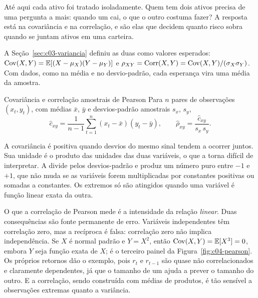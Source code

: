 Até aqui cada ativo foi tratado isoladamente. Quem tem dois ativos precisa de uma pergunta a mais: quando um cai, o que o outro costuma fazer? A resposta está na covariância e na correlação, e são elas que decidem quanto risco sobra quando se juntam ativos em uma carteira.

A Seção~\ref{sec:c03-variancia} definiu as duas como valores esperados: $\operatorname{Cov}(X, Y) = \operatorname{\mathbb{E}}[(X-\mu_X)(Y-\mu_Y)]$ e $\rho_{XY} = \operatorname{Corr}(X, Y) = \operatorname{Cov}(X, Y)/(\sigma_X\sigma_Y)$. Com dados, como na média e no desvio-padrão, cada esperança vira uma média da amostra.

\begin{definicao}{Covariância e correlação amostrais de Pearson}
Para $n$ pares de observações $(x_t, y_t)$, com médias $\bar x$, $\bar y$ e desvios-padrão amostrais $s_x$, $s_y$,
\begin{equation}
  \hat c_{xy} = \frac{1}{n-1}\sum_{t=1}^{n} (x_t - \bar x)(y_t - \bar y) , \qquad
  \hat\rho_{xy} = \frac{\hat c_{xy}}{s_x\, s_y} .
  \label{eq:c04-corr}
\end{equation}
\end{definicao}

A covariância é positiva quando desvios do mesmo sinal tendem a ocorrer juntos. Sua unidade é o produto das unidades das duas variáveis, o que a torna difícil de interpretar. A  divide pelos desvios-padrão e produz um número puro entre $-1$ e $+1$, que não muda se as variáveis forem multiplicadas por constantes positivas ou somadas a constantes. Os extremos só são atingidos quando uma variável é função linear exata da outra.

O que a correlação de Pearson mede é a intensidade da relação \emph{linear}. Duas consequências são fonte permanente de erro. Variáveis independentes têm correlação zero, mas a recíproca é falsa: correlação zero não implica independência. Se $X$ é normal padrão e $Y = X^2$, então $\operatorname{Cov}(X, Y) = \operatorname{\mathbb{E}}[X^3] = 0$, embora $Y$ seja função exata de $X$; é o terceiro painel da Figura~\ref{fig:c04-pearson}. Os próprios retornos dão o exemplo, pois $r_t$ e $r_{t-1}$ são quase não correlacionados e claramente dependentes, já que o tamanho de um ajuda a prever o tamanho do outro. E a correlação, sendo construída com médias de produtos, é tão sensível a observações extremas quanto a variância.


